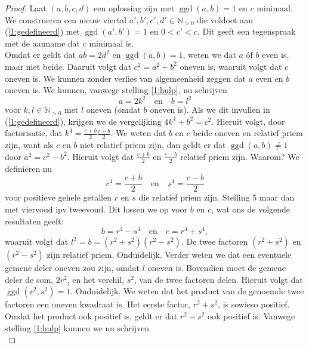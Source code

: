 \documentclass[12pt,reqno]{article}
\newcommand*{\NO}{\ensuremath{\mathbb{N}_{>0}}}
\theoremstyle{theorem}
\theoremstyle{definition}
\DeclareMathOperator{\ggd}{ggd}
\begin{document}
\begin{proof}
		Laat $(a, b, c, d)$ een oplossing zijn met $\ggd(a,b) = 1$ en $c$ minimaal. We construeren een nieuw viertal $a', b', c', d' \in\NO$ die voldoet aan (\ref{1:gedefineerd}) met $\ggd(a',b') = 1$ en $0 < c' < c$. Dit geeft een tegenspraak met de aanname dat $c$ minimaal is.\\
		
		Omdat er geldt dat $ab = 2d^2$ en $\ggd(a,b)=1$, weten we dat $a$ \'of $b$ even is, maar niet beide. Daaruit volgt dat $c^2 = a^2 + b^2$ oneven is, waaruit volgt dat $c$ oneven is. We kunnen zonder verlies van algemeenheid zeggen dat $a$ even en $b$ oneven is. We kunnen, vanwege stelling \ref{1:hulp}, nu schrijven
		\begin{equation*}
			a = 2k^2 \quad \text{en} \quad b = l^2
		\end{equation*}
		voor $k,l\in\NO$ met $l$ oneven (omdat $b$ oneven is). Als we dit invullen in (\ref{1:gedefineerd}), krijgen we de vergelijking $4k^4 + b^2 = c^2$. Hieruit volgt, door factorisatie, dat $k^4 = \frac{c+b}{2}\frac{c-b}{2}$. We weten dat $b$ en $c$ beide oneven en relatief priem zijn, want als $c$ en $b$ niet relatief priem zijn, dan geldt er dat $\ggd(a,b)\neq1$ door $a^2 = c^2 - b^2$. Hieruit volgt dat $\frac{c+b}{2}$ en $\frac{c-b}{2}$ relatief priem zijn. {\color{red}Waarom?} We defini\"eren nu
		\begin{equation*}
			r^4 = \frac{c+b}{2} \quad \text{en} \quad s^4 = \frac{c-b}{2}
		\end{equation*}
		voor positieve gehele getallen $r$ en $s$ die relatief priem zijn. {\color{red}Stelling 5 maar dan met viervoud ipv tweevoud.} Dit lossen we op voor $b$ en $c$, wat ons de volgende resultaten geeft:
		\begin{equation*}
			b = r^4 - s^4 \quad \text{en} \quad c = r^4 + s^4,
		\end{equation*}
		waaruit volgt dat $l^2 = b = (r^2 + s^2) (r^2 - s^2)$. De twee factoren $(r^2 + s^2)$ en $(r^2 - s^2)$ zijn relatief priem. {\color{red}Onduidelijk.} Verder weten we dat een eventuele gemene deler oneven zou zijn, omdat $l$ oneven is. Bovendien moet de gemene deler de som, $2r^2$, en het verchil, $s^2$, van de twee factoren delen. Hieruit volgt dat $\ggd(r^2,s^2) = 1$. {\color{red}Onduidelijk.} We weten dat het product van de genoemde twee factoren een oneven kwadraat is. Het eerste factor, $r^2 + s^2$, is sowieso positief. Omdat het product ook positief is, geldt er dat $r^2 - s^2$ ook positief is. Vanwege stelling \ref{1:hulp} kunnen we nu schrijven 
		\begin{equation}\label{1:r}

\end{equation}
\end{proof}
\end{document}
